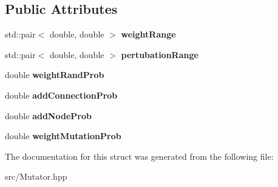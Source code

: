 \subsection*{Public Attributes}
\begin{DoxyCompactItemize}
\item 
\mbox{\label{struct_indie_neat_1_1_mutator_1_1_settings_ae30aec8ccc7dcfc2a661a7ec36bb5765}} 
std\+::pair$<$ double, double $>$ {\bfseries weight\+Range}
\item 
\mbox{\label{struct_indie_neat_1_1_mutator_1_1_settings_a78f388242170815faa91a597d89fcf58}} 
std\+::pair$<$ double, double $>$ {\bfseries pertubation\+Range}
\item 
\mbox{\label{struct_indie_neat_1_1_mutator_1_1_settings_a2bc1c3afedcb9f9235836d4a70e25de2}} 
double {\bfseries weight\+Rand\+Prob}
\item 
\mbox{\label{struct_indie_neat_1_1_mutator_1_1_settings_ad62edb975c3d76c0215a69438f0bcbc7}} 
double {\bfseries add\+Connection\+Prob}
\item 
\mbox{\label{struct_indie_neat_1_1_mutator_1_1_settings_a349a029ab408d4e24495eb38b3800f09}} 
double {\bfseries add\+Node\+Prob}
\item 
\mbox{\label{struct_indie_neat_1_1_mutator_1_1_settings_ad51d060e7306b4bd09feac87f738219a}} 
double {\bfseries weight\+Mutation\+Prob}
\end{DoxyCompactItemize}


The documentation for this struct was generated from the following file\+:\begin{DoxyCompactItemize}
\item 
src/Mutator.\+hpp\end{DoxyCompactItemize}
